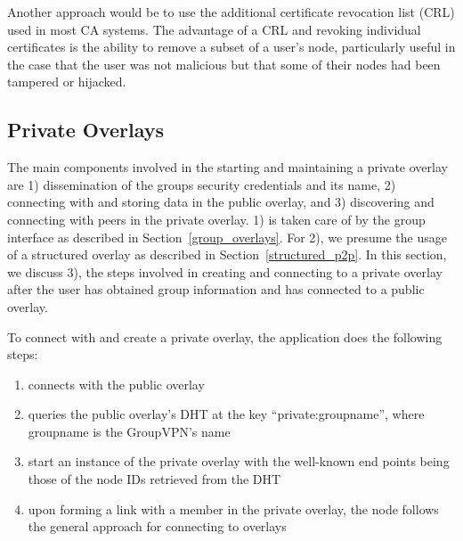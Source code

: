 \documentclass[conference]{IEEEtran}
\begin{document}
Another approach would be to use the additional certificate revocation list
(CRL) used in most CA systems.  The advantage of a CRL and revoking individual
certificates is the ability to remove a subset of a user's node, particularly
useful in the case that the user was not malicious but that some of their nodes
had been tampered or hijacked.

\subsection{Private Overlays}
The main components involved in the starting and maintaining a private overlay
are 1) dissemination of the groups security credentials and its name, 2) 
connecting with and storing data in the public overlay, and 3) discovering and
connecting with peers in the private overlay.  1) is taken care of by the group
interface as described in Section~\ref{group_overlays}.  For 2), we presume the
usage of a structured overlay as described in Section~\ref{structured_p2p}.  In
this section, we discuss 3), the steps involved in creating and connecting to a
private overlay after the user has obtained group information and has connected
to a public overlay.

To connect with and create a private overlay, the application does the following
steps:
\begin{enumerate}
\setlength{\itemsep}{0pt}
\setlength{\parskip}{0pt}
\item connects with the public overlay
\item queries the public overlay's DHT at the key ``private:groupname'', where
groupname is the GroupVPN's name
\item start an instance of the private overlay with the well-known end points
being those of the node IDs retrieved from the DHT
\item upon forming a link with a member in the private overlay, the node follows
the general approach for connecting to overlays
\end{enumerate}

\end{document}
